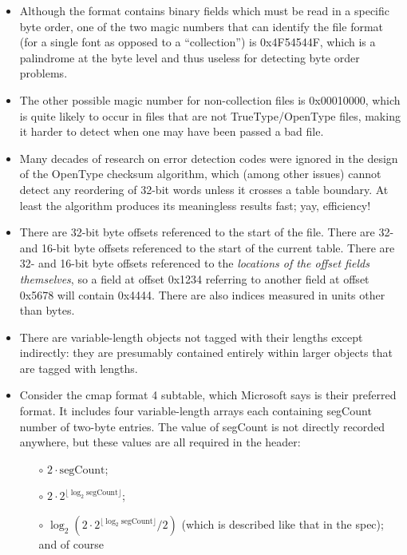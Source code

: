 \documentclass[twocolumn]{report}
\begin{document}
\begin{itemize}
  \item Although the format contains binary fields which must be read
    in a specific byte order, one of the two magic numbers that can
    identify the file format (for a single font as opposed to a
    ``collection'') is 0x4F54544F, which is a palindrome at the byte
    level and thus useless for detecting byte order problems.
  \item The other possible magic number for non-collection files
    is 0x00010000, which is quite likely to occur in files that are
    not TrueType/OpenType files, making it harder to detect when one
    may have been passed a bad file.
  \item Many decades of research on error detection codes were ignored
    in the design of the OpenType checksum algorithm, which (among
    other issues) cannot detect any reordering of 32-bit words unless
    it crosses a table boundary.  At least the algorithm produces its
    meaningless results fast; yay, efficiency!
  \item There are 32-bit byte offsets referenced to the start of the file.
    There are 32- and 16-bit byte offsets referenced to the start of
    the current table.  There are 32- and 16-bit byte offsets
    referenced to the \emph{locations of the offset fields themselves}, so a
    field at offset 0x1234 referring to another field at offset 0x5678
    will contain 0x4444.  There are also indices measured in units
    other than bytes.
  \item There are variable-length objects not tagged
    with their lengths except indirectly: they are presumably
    contained entirely within larger objects that are tagged with lengths.
  \item Consider the cmap format 4 subtable, which Microsoft
    says is their preferred format.  It includes four
    variable-length arrays each containing segCount
    number of two-byte entries.  The value of segCount is not directly
    recorded anywhere, but these values are all required
    in the header:
    \begin{itemize}
      \item[$\circ$] $2 \cdot \textrm{segCount}$;
      \item[$\circ$] $2 \cdot 2^{\lfloor \log_2 \textrm{segCount} \rfloor}$;
      \item[$\circ$] $\log_2 (2 \cdot 2^{\lfloor \log_2 \textrm{segCount}
        \rfloor}/2)$ (which is described like that in the spec);
        and of course

\end{itemize}
\end{itemize}
\end{document}

